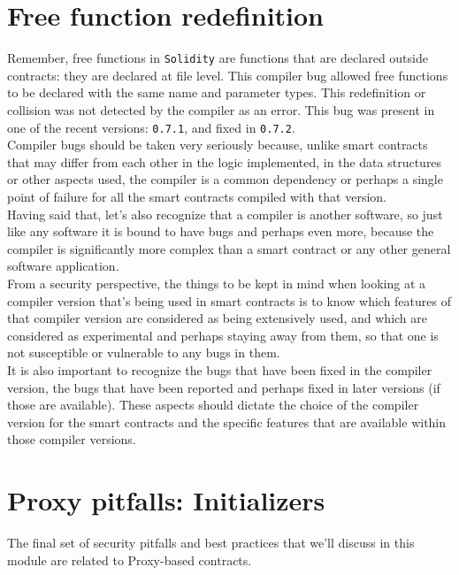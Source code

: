 \section{Free function redefinition}
Remember, free functions in \texttt{Solidity} are functions that are declared outside contracts: they are declared at file level. This compiler bug allowed free functions to be declared with the same name and parameter types. This redefinition or collision was not detected by the compiler as an error. This bug was present in one of the recent versions: \texttt{0.7.1}, and fixed in \texttt{0.7.2}.\\

Compiler bugs should be taken very seriously because, unlike smart contracts that may differ from each other in the logic implemented, in the data structures or other aspects used, the compiler is a common dependency or perhaps a single point of failure for all the smart contracts compiled with that version.\\

Having said that, let's also recognize that a compiler is another software, so just like any software it is bound to have bugs and perhaps even more, because the compiler is significantly more complex than a smart contract or any other general software application.\\

From a security perspective, the things to be kept in mind when looking at a compiler version that's being used in smart contracts is to know which features of that compiler version are considered as being extensively used, and which are considered as experimental and perhaps staying away from them, so that one is not susceptible or vulnerable to any bugs in them. \\

It is also important to recognize the bugs that have been fixed in the compiler version, the bugs that have been reported and perhaps fixed in later versions (if those are available). These aspects should dictate the choice of the compiler version for the smart contracts and the specific features that are available within those compiler versions.

\section{Proxy pitfalls: Initializers}
The final set of security pitfalls and best practices that we'll discuss in this module are related to Proxy-based contracts.\\

